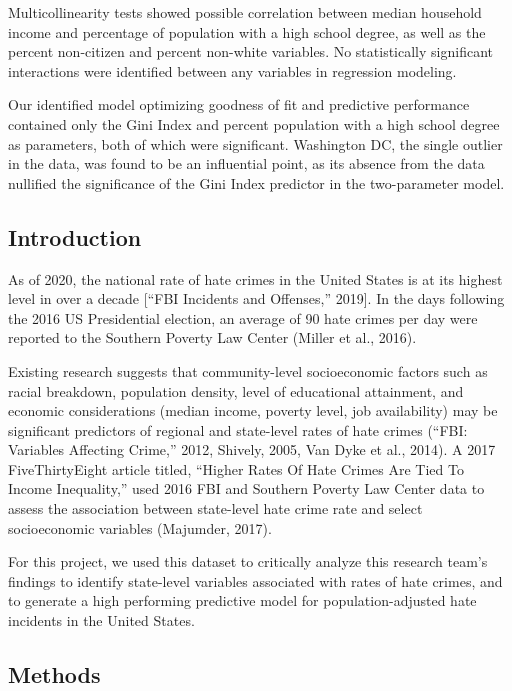 \documentclass[
]{article}
\begin{document}
Multicollinearity tests showed possible correlation between median
household income and percentage of population with a high school degree,
as well as the percent non-citizen and percent non-white variables. No
statistically significant interactions were identified between any
variables in regression modeling.

Our identified model optimizing goodness of fit and predictive
performance contained only the Gini Index and percent population with a
high school degree as parameters, both of which were significant.
Washington DC, the single outlier in the data, was found to be an
influential point, as its absence from the data nullified the
significance of the Gini Index predictor in the two-parameter model.

\hypertarget{introduction}{%
\subsection{Introduction}\label{introduction}}

As of 2020, the national rate of hate crimes in the United States is at
its highest level in over a decade {[}``FBI Incidents and Offenses,''
2019{]}. In the days following the 2016 US Presidential election, an
average of 90 hate crimes per day were reported to the Southern Poverty
Law Center (Miller et al., 2016).

Existing research suggests that community-level socioeconomic factors
such as racial breakdown, population density, level of educational
attainment, and economic considerations (median income, poverty level,
job availability) may be significant predictors of regional and
state-level rates of hate crimes (``FBI: Variables Affecting Crime,''
2012, Shively, 2005, Van Dyke et al., 2014). A 2017 FiveThirtyEight
article titled, ``Higher Rates Of Hate Crimes Are Tied To Income
Inequality,'' used 2016 FBI and Southern Poverty Law Center data to
assess the association between state-level hate crime rate and select
socioeconomic variables (Majumder, 2017).

For this project, we used this dataset to critically analyze this
research team's findings to identify state-level variables associated
with rates of hate crimes, and to generate a high performing predictive
model for population-adjusted hate incidents in the United States.

\hypertarget{methods}{%
\subsection{Methods}\label{methods}}
\end{document}
